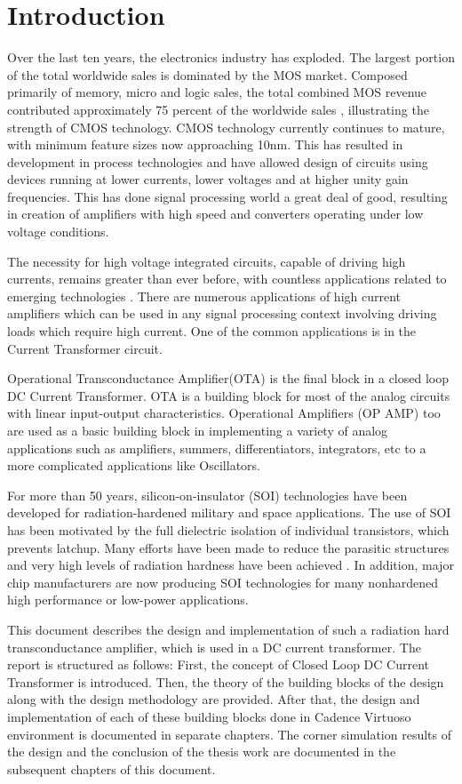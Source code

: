\chapter{Introduction}
Over the last ten years, the electronics industry has exploded. The largest portion of the total worldwide sales is dominated by the MOS market. Composed primarily of memory, micro and logic sales, the total combined MOS revenue contributed approximately 75 percent of the worldwide sales \cite{baker_book}, illustrating the strength of CMOS technology. CMOS technology currently continues to mature, with minimum feature sizes now approaching 10nm. This has resulted in development in process technologies and have allowed design of circuits using devices running at lower currents, lower voltages and at higher unity gain frequencies. This has done signal processing world a great deal of good, resulting in creation of amplifiers with high speed and converters operating under low voltage conditions.

The necessity for high voltage integrated circuits, capable of driving high currents, remains greater than ever before, with countless applications related to emerging technologies \cite{intro}. There are numerous applications of high current amplifiers which can be used in any signal processing context involving driving loads which require high current. One of the common applications is in the Current Transformer circuit.

Operational Transconductance Amplifier(OTA) is the final block in a closed loop DC Current Transformer. OTA is a building block for most of the analog circuits with linear input-output characteristics. Operational Amplifiers (OP AMP) too are used as a basic building block in implementing a variety of analog applications such as amplifiers, summers, differentiators, integrators, etc to a more complicated applications like Oscillators. 

For more than 50 years, silicon-on-insulator (SOI) technologies have been developed for radiation-hardened military and space applications.  The  use  of  SOI  has  been  motivated  by  the  full dielectric  isolation  of  individual  transistors,  which  prevents latchup. Many efforts have been made to reduce the parasitic structures and very high levels of radiation hardness have been achieved \cite{colinge}. In addition, major chip manufacturers are now producing SOI technologies for many nonhardened high performance or low-power applications.

This document describes the design and implementation of such a radiation hard transconductance amplifier, which is used in a DC current transformer. The report is structured as follows: First, the concept of Closed Loop DC Current Transformer is introduced. Then, the theory of the building blocks of the design along with the design methodology are provided. After that, the design and implementation of each of these building blocks done in Cadence Virtuoso environment is documented in separate chapters. The corner simulation results of the design and the conclusion of the thesis work are documented in the subsequent chapters of this document.

